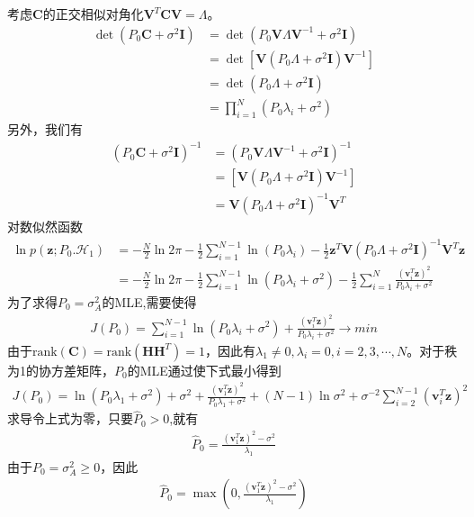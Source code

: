 \documentclass[fontset=windows]{article}
\numberwithin{figure}{section}
\begin{document}
考虑\(\mathbf{C}\)的正交相似对角化\(\mathbf{V}^T\mathbf{C}\mathbf{V}=\Lambda\)。
\begin{align*}
	\det(P_0\mathbf{C}+\sigma^2\mathbf{I})
	 & =\det\left(P_0\mathbf{V}\Lambda\mathbf{V}^{-1}+\sigma^2\mathbf{I}\right) \\
	 & =\det[\mathbf{V}(P_0\Lambda+\sigma^2\mathbf{I})\mathbf{V}^{-1}]          \\
	 & =\det(P_0\Lambda+\sigma^2\mathbf{I})                                     \\
	 & =\prod_{i=1}^{N}(P_0\lambda_i+\sigma^2)
\end{align*}
另外，我们有
\begin{align*}
	(P_0\mathbf{C}+\sigma^2\mathbf{I})^{-1}
	 & =(P_0\mathbf{V}\Lambda\mathbf{V}^{-1}+\sigma^2\mathbf{I})^{-1} \\
	 & =[\mathbf{V}(P_0\Lambda+\sigma^2\mathbf{I})\mathbf{V}^{-1}]    \\
	 & =\mathbf{V}(P_0\Lambda+\sigma^2\mathbf{I})^{-1}\mathbf{V}^T
\end{align*}
对数似然函数
\begin{align*}
	\ln p(\mathbf{z};P_0.\mathcal{H}_1)
	 & =-\frac{N}{2}\ln 2\pi -\frac{1}{2}\sum_{i=1}^{N-1}\ln
	(P_0\lambda_i)-\frac{1}{2}\mathbf{z}^T\mathbf{V}(P_0\Lambda+\sigma^2\mathbf{I})^{-1}\mathbf{V}^T\mathbf{z} \\
	 & =-\frac{N}{2}\ln 2\pi -\frac{1}{2}\sum_{i=1}^{N-1}\ln(P_0\lambda_i+\sigma^2)
	-\frac{1}{2}\sum_{i=1}^{N}\frac{(\mathbf{v}^T_i\mathbf{z})^2}{P_0\lambda_i+\sigma^2}
\end{align*}
为了求得\(P_0=\sigma^2_A\)的MLE,需要使得
\begin{align*}
	J(P_0)=\sum_{i=1}^{N-1}\ln(P_0\lambda_i+\sigma^2)
	+\frac{(\mathbf{v}^T_i\mathbf{z})^2}{P_0\lambda_i+\sigma^2}\to min
\end{align*}
由于\(\text{rank}(\mathbf{C})=\text{rank}(\mathbf{HH}^T)=1\)，因此有\(\lambda_1\neq 0,\lambda_i=0,i=2,3,\cdots, N\)。对于秩为1的协方差矩阵，\(P_0\)的MLE通过使下式最小得到
\begin{align*}
	J(P_0)=\ln(P_0\lambda_1+\sigma^2)+\sigma^2+\frac{(\mathbf{v}_1^T\mathbf{z})^2}{P_0\lambda_1+\sigma^2}
	+(N-1)\ln \sigma^2+\sigma^{-2}\sum_{i=2}^{N-1}(\mathbf{v}_i^T\mathbf{z})^2
\end{align*}
求导令上式为零，只要\(\hat{P}_0>0\),就有
\begin{align*}
	\hat{P}_0=\frac{(\mathbf{v}_1^T\mathbf{z})^2-\sigma^2}{\lambda_1}
\end{align*}
由于\(P_0=\sigma^2_A\geq0\)，因此
\begin{align*}
	\hat{P}_0=\max(0,\frac{(\mathbf{v}_1^T\mathbf{z})^2-\sigma^2}{\lambda_1})
\end{align*}
\end{document}
